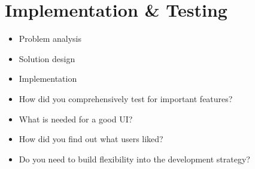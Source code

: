 \chapter{Implementation \& Testing}
\label{chap:implementation}


\begin{itemize}
  \item Problem analysis
  \item Solution design
  \item Implementation
  \item How did you comprehensively test for important features?
  \item What is needed for a good UI?
  \item How did you find out what users liked?
  \item Do you need to build flexibility into the development strategy?
\end{itemize}

